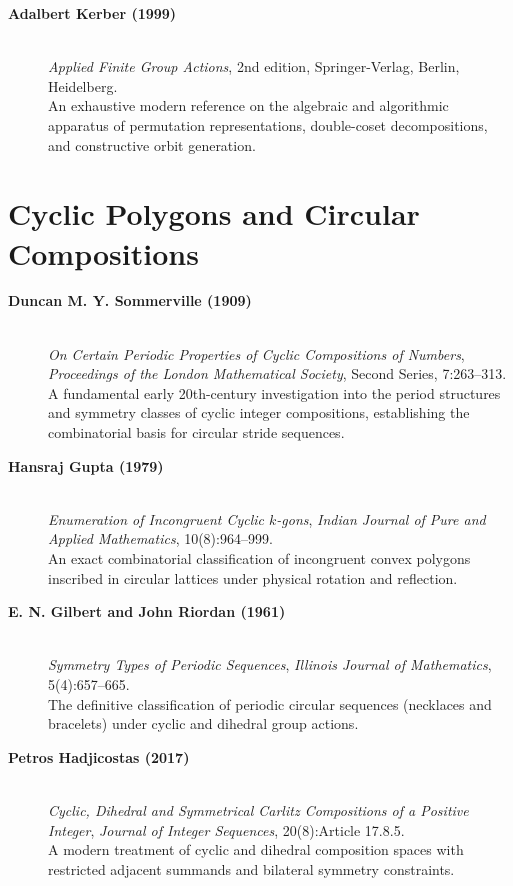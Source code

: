 \begin{description}
    \item[\textbf{Adalbert Kerber (1999)}]\mbox{}\\
    \emph{Applied Finite Group Actions}, 2nd edition, Springer-Verlag, Berlin, Heidelberg.\\
    An exhaustive modern reference on the algebraic and algorithmic apparatus of permutation representations, double-coset decompositions, and constructive orbit generation.
\end{description}

\section*{Cyclic Polygons and Circular Compositions}

\begin{description}
    \item[\textbf{Duncan M. Y. Sommerville (1909)}]\mbox{}\\
    \emph{On Certain Periodic Properties of Cyclic Compositions of Numbers}, \emph{Proceedings of the London Mathematical Society}, Second Series, 7:263--313.\\
    A fundamental early 20th-century investigation into the period structures and symmetry classes of cyclic integer compositions, establishing the combinatorial basis for circular stride sequences.

    \item[\textbf{Hansraj Gupta (1979)}]\mbox{}\\
    \emph{Enumeration of Incongruent Cyclic $k$-gons}, \emph{Indian Journal of Pure and Applied Mathematics}, 10(8):964--999.\\
    An exact combinatorial classification of incongruent convex polygons inscribed in circular lattices under physical rotation and reflection.

    \item[\textbf{E. N. Gilbert and John Riordan (1961)}]\mbox{}\\
    \emph{Symmetry Types of Periodic Sequences}, \emph{Illinois Journal of Mathematics}, 5(4):657--665.\\
    The definitive classification of periodic circular sequences (necklaces and bracelets) under cyclic and dihedral group actions.

    \item[\textbf{Petros Hadjicostas (2017)}]\mbox{}\\
    \emph{Cyclic, Dihedral and Symmetrical Carlitz Compositions of a Positive Integer}, \emph{Journal of Integer Sequences}, 20(8):Article 17.8.5.\\
    A modern treatment of cyclic and dihedral composition spaces with restricted adjacent summands and bilateral symmetry constraints.
\end{description}

